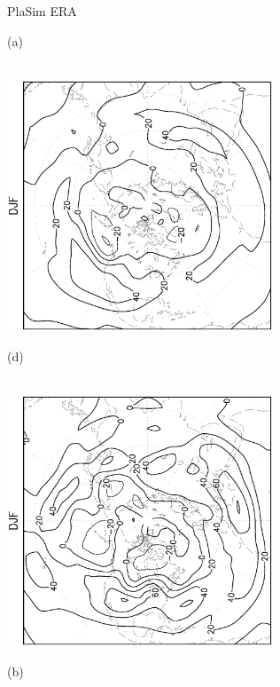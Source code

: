\documentclass[12pt,a4paper,twoside,openright,headinclude,liststotoc,bibtotoc]{scrreprt}
\begin{document}
\begin{figure}[b]
\hspace{3.5cm}PlaSim \vspace{0.2cm} \hspace{7.3cm} ERA \\
\parbox{8.5cm}{\hspace{0.90cm}\begin{scriptsize}(a)\end{scriptsize} \vspace{-0.5cm} \\
\includegraphics[height=7.5cm,angle=-90]
{eps/PLDJF300fluxes_tr.eps}
}
\parbox{8.5cm}{\hspace{0.95cm}\begin{scriptsize}(d)\end{scriptsize} \vspace{-0.5cm} \\
\includegraphics[height=7.5cm,angle=-90]
{eps/ERADJF300fluxes_tr.eps}
}
\parbox{8.5cm}{\hspace{0.90cm}\begin{scriptsize}(b)\end{scriptsize} \vspace{-0.2cm} \\
}
\end{figure}
\end{document}
